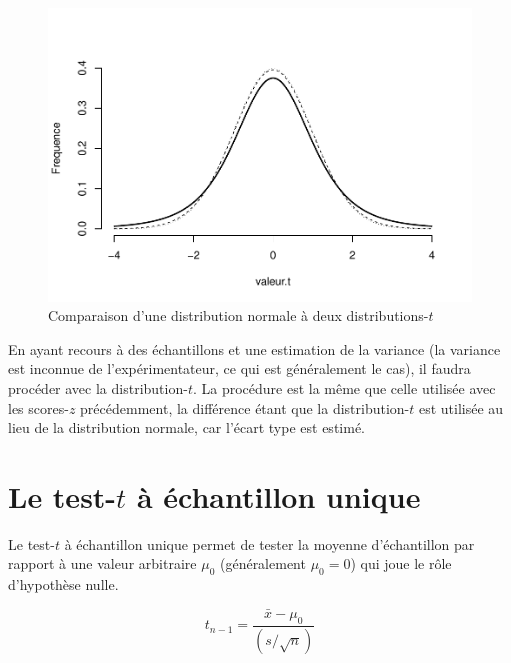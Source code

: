 \documentclass[
]{book}
\begin{document}
\begin{figure}

{\centering \includegraphics[width=0.9\linewidth,height=0.9\textheight]{08-Inferer_files/figure-latex/tnorm-1} 

}

\caption{Comparaison d'une distribution normale à deux distributions-$t$}\label{fig:tnorm}
\end{figure}

En ayant recours à des échantillons et une estimation de la variance (la variance est inconnue de l'expérimentateur, ce qui est généralement le cas), il faudra procéder avec la distribution-\(t\). La procédure est la même que celle utilisée avec les scores-\(z\) précédemment, la différence étant que la distribution-\(t\) est utilisée au lieu de la distribution normale, car l'écart type est estimé.

\hypertarget{le-test-t-uxe0-uxe9chantillon-unique}{%
\section{\texorpdfstring{Le test-\(t\) à échantillon unique}{Le test-t à échantillon unique}}\label{le-test-t-uxe0-uxe9chantillon-unique}}

Le test-\(t\) à échantillon unique permet de tester la moyenne d'échantillon par rapport à une valeur arbitraire \(\mu_0\) (généralement \(\mu_0 = 0\)) qui joue le rôle d'hypothèse nulle.

\[ t_{n-1} = \frac{\bar{x}-\mu_0}{(s/\sqrt{n})} \]
\end{document}

